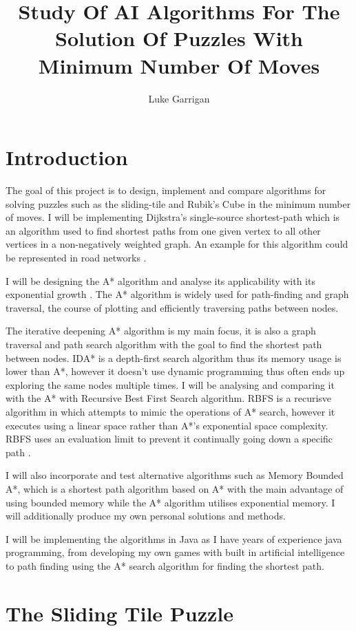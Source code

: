 \documentclass[proposal]{cmpreport}
\title{Study Of AI Algorithms For The Solution Of Puzzles With Minimum Number Of Moves}
\author{Luke Garrigan}
\begin{document}
\section{Introduction}




The goal of this project is to design, implement and compare algorithms for solving puzzles such as the sliding-tile and Rubik's Cube in the minimum number of moves. I will be implementing Dijkstra's single-source shortest-path which is an algorithm used to find shortest paths from one
given vertex to all other vertices in a non-negatively weighted graph. An example for this algorithm could be represented in road networks \cite{DBLP:journals/afp/NordhoffL12}.

I will be designing the A* algorithm and analyse its applicability with its exponential growth \cite{DBLP:journals/ai/Korf93}. The A* algorithm is widely used for path-finding and graph traversal, the course of plotting and efficiently traversing paths between nodes.

The iterative deepening A* algorithm is my main focus, it is also a graph traversal and path search algorithm with the goal to find the shortest path between nodes. IDA* is a depth-first search algorithm thus its memory usage is lower than A*, however it doesn't use dynamic programming thus often ends up exploring the same nodes multiple times. I will be analysing and comparing it with the A* with Recursive Best First Search algorithm. RBFS is a recurisve algorithm in which attempts to mimic the operations of A* search, however it executes using a linear space rather than A*'s exponential space complexity. RBFS uses an evaluation limit to prevent it continually going down a specific path \cite{DBLP:conf/aaai/HatemKR15}.

I will also incorporate and test alternative algorithms such as Memory Bounded A*, which is a shortest path algorithm based on A* with the main advantage of using bounded memory while the A* algorithm utilises exponential memory. I will additionally produce my own personal solutions and methods.

I will be implementing the algorithms in Java as I have years of experience java programming, from developing my own games with built in artificial intelligence to path finding using the A* search algorithm for finding the shortest path.  


\section{The Sliding Tile Puzzle} \label{sec1}
\end{document}
